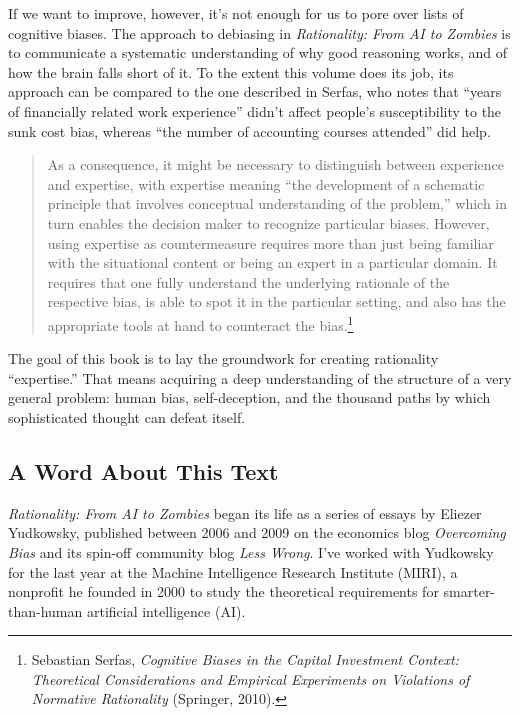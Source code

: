 \documentclass[letterpaper]{book}
\newcommand{\comment}[1]{
}
\begin{document}
{
 If we want to improve, however, it's not enough
for us to pore over lists of cognitive biases. The approach to
debiasing in \textit{Rationality: From AI to Zombies} is to communicate
a systematic understanding of why good reasoning works, and of how the
brain falls short of it. To the extent this volume does its job, its
approach can be compared to the one described in Serfas, who notes that
``years of financially related work
experience'' didn't affect
people's susceptibility to the sunk cost bias, whereas
``the number of accounting courses
attended'' did help.}

\begin{quote}
 As a consequence, it might be necessary to distinguish between
experience and expertise, with expertise meaning ``the
development of a schematic principle that involves conceptual
understanding of the problem,'' which in turn enables
the decision maker to recognize particular biases. However, using
expertise as countermeasure requires more than just being familiar with
the situational content or being an expert in a particular domain. It
requires that one fully understand the underlying rationale of the
respective bias, is able to spot it in the particular setting, and also
has the appropriate tools at hand to counteract the
bias.\footnote{Sebastian Serfas, \textit{Cognitive Biases in the Capital
Investment Context: Theoretical Considerations and Empirical
Experiments on Violations of Normative Rationality} (Springer, 2010).\comment{19}}
\end{quote}

{
 The goal of this book is to lay the groundwork for creating
rationality ``expertise.'' That
means acquiring a deep understanding of the structure of a very general
problem: human bias, self-deception, and the thousand paths by which
sophisticated thought can defeat itself.}

\subsection{A Word About This Text}

{
 \textit{Rationality: From AI to Zombies} began its life as a
series of essays by Eliezer Yudkowsky, published between 2006 and 2009
on the economics blog \textit{Overcoming Bias} and its spin-off
community blog \textit{Less Wrong}. I've worked with
Yudkowsky for the last year at the Machine Intelligence Research
Institute (MIRI), a nonprofit he founded in 2000 to study the
theoretical requirements for smarter-than-human artificial intelligence
(AI).}
\end{document}
